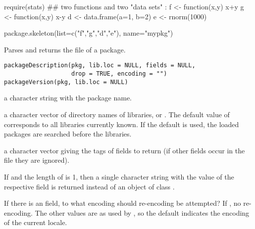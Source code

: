 %
\begin{Examples}
\begin{ExampleCode}
require(stats)
## two functions and two "data sets" :
f <- function(x,y) x+y
g <- function(x,y) x-y
d <- data.frame(a=1, b=2)
e <- rnorm(1000)

package.skeleton(list=c("f","g","d","e"), name="mypkg")

\end{ExampleCode}
\end{Examples}
%
\begin{Description}\relax
Parses and returns the  file of a package.
\end{Description}
%
\begin{Usage}
\begin{verbatim}
packageDescription(pkg, lib.loc = NULL, fields = NULL,
                   drop = TRUE, encoding = "")
packageVersion(pkg, lib.loc = NULL)
\end{verbatim}
\end{Usage}
%
\begin{Arguments}
\begin{ldescription}
\item[\code{pkg}] a character string with the package name.
\item[\code{lib.loc}] a character vector of directory names of \R{} libraries,
or .  The default value of  corresponds to all
libraries currently known.  If the default is used, the loaded
packages are searched before the libraries.
\item[\code{fields}] a character vector giving the tags of fields to return
(if other fields occur in the file they are ignored).
\item[\code{drop}] If  and the length of  is 1, then
a single character string with the value of the respective field is
returned instead of an object of class .
\item[\code{encoding}] If there is an  field, to what encoding
should re-encoding be attempted?  If , no re-encoding.  The
other values are as used by , so the default
 indicates the encoding of the current locale.
\end{ldescription}
\end{Arguments}
